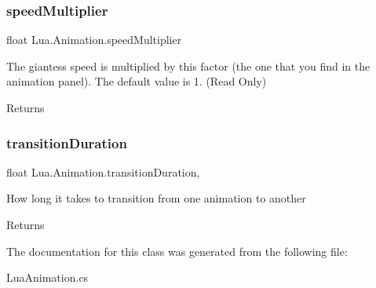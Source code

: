 \subsubsection{\texorpdfstring{speedMultiplier}{speedMultiplier}}
{\footnotesize\ttfamily float Lua.\+Animation.\+speed\+Multiplier\hspace{0.3cm}{\ttfamily [get]}}



The giantess speed is multiplied by this factor (the one that you find in the animation panel). The default value is 1. (Read Only) 

\begin{DoxyReturn}{Returns}

\end{DoxyReturn}
\mbox{\label{class_lua_1_1_animation_ad1f57da869e710f55a79e82ceb579cc0}} 
\subsubsection{\texorpdfstring{transitionDuration}{transitionDuration}}
{\footnotesize\ttfamily float Lua.\+Animation.\+transition\+Duration\hspace{0.3cm}{\ttfamily [get]}, {\ttfamily [set]}}



How long it takes to transition from one animation to another 

\begin{DoxyReturn}{Returns}

\end{DoxyReturn}


The documentation for this class was generated from the following file\+:\begin{DoxyCompactItemize}
\item 
Lua\+Animation.\+cs\end{DoxyCompactItemize}
